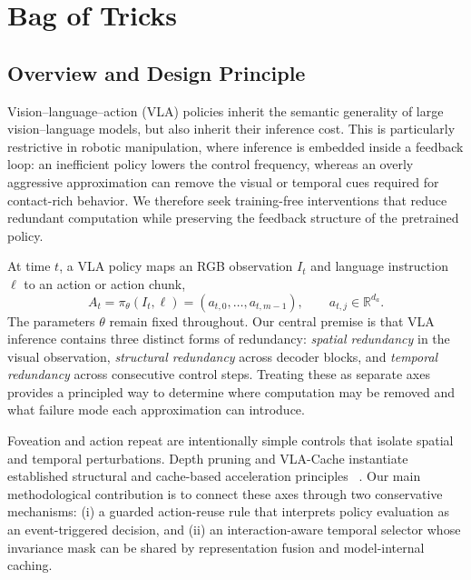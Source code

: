 \section{Bag of Tricks}
\label{sec:bag_of_tricks}

\subsection{Overview and Design Principle}

Vision--language--action (VLA) policies inherit the semantic generality of
large vision--language models, but also inherit their inference cost. This is
particularly restrictive in robotic manipulation, where inference is embedded
inside a feedback loop: an inefficient policy lowers the control frequency,
whereas an overly aggressive approximation can remove the visual or temporal
cues required for contact-rich behavior. We therefore seek training-free
interventions that reduce redundant computation while preserving the feedback
structure of the pretrained policy.

At time $t$, a VLA policy maps an RGB observation $I_t$ and language instruction
$\ell$ to an action or action chunk,
\begin{equation}
    A_t=\pi_\theta(I_t,\ell)
       =(a_{t,0},\ldots,a_{t,m-1}),
    \qquad a_{t,j}\in\mathbb{R}^{d_a}.
    \label{eq:vla_formulation}
\end{equation}
The parameters $\theta$ remain fixed throughout. Our central premise is that
VLA inference contains three distinct forms of redundancy: \emph{spatial
redundancy} in the visual observation, \emph{structural redundancy} across
decoder blocks, and \emph{temporal redundancy} across consecutive control
steps. Treating these as separate axes provides a principled way to determine
where computation may be removed and what failure mode each approximation can
introduce.

Foveation and action repeat are intentionally simple controls that isolate
spatial and temporal perturbations. Depth pruning and VLA-Cache instantiate
established structural and cache-based acceleration principles
~\cite{shortgpt,efficientvla,vlacache}. Our main methodological contribution is
to connect these axes through two conservative mechanisms: (i) a guarded
action-reuse rule that interprets policy evaluation as an event-triggered
decision, and (ii) an interaction-aware temporal selector whose invariance mask
can be shared by representation fusion and model-internal caching.

